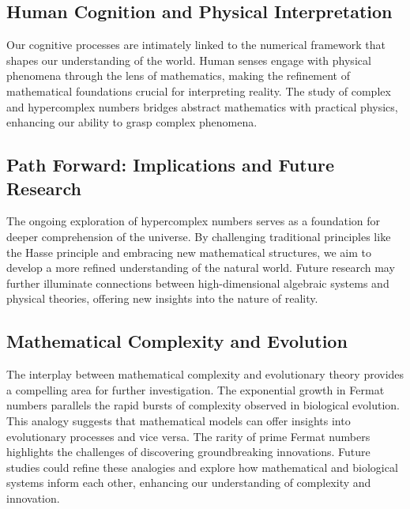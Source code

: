 \documentclass[12pt]{article}
\begin{document}
\subsection{Human Cognition and Physical Interpretation}

Our cognitive processes are intimately linked to the numerical framework that shapes our understanding of the world. Human senses engage with physical phenomena through the lens of mathematics, making the refinement of mathematical foundations crucial for interpreting reality. The study of complex and hypercomplex numbers bridges abstract mathematics with practical physics, enhancing our ability to grasp complex phenomena.

\subsection{Path Forward: Implications and Future Research}

The ongoing exploration of hypercomplex numbers serves as a foundation for deeper comprehension of the universe. By challenging traditional principles like the Hasse principle and embracing new mathematical structures, we aim to develop a more refined understanding of the natural world. Future research may further illuminate connections between high-dimensional algebraic systems and physical theories, offering new insights into the nature of reality.

\subsection{Mathematical Complexity and Evolution}

The interplay between mathematical complexity and evolutionary theory provides a compelling area for further investigation. The exponential growth in Fermat numbers parallels the rapid bursts of complexity observed in biological evolution. This analogy suggests that mathematical models can offer insights into evolutionary processes and vice versa. The rarity of prime Fermat numbers highlights the challenges of discovering groundbreaking innovations. Future studies could refine these analogies and explore how mathematical and biological systems inform each other, enhancing our understanding of complexity and innovation.
\end{document}
